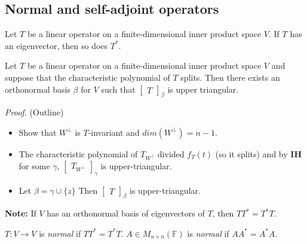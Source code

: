 \documentclass[12pt]{article}
\newenvironment{lemma}[2][Lemma]{\begin{trivlist}
\item[\hskip \labelsep {\bfseries #1}\hskip \labelsep {\bfseries #2.}]}{\end{trivlist}}
\newenvironment{theorem}[2][Theorem]{\begin{trivlist}
\item[\hskip \labelsep {\bfseries #1}\hskip \labelsep {\bfseries #2.}]}{\end{trivlist}}
\newenvironment{definition}[2][Definition]{\begin{trivlist}
\item[\hskip \labelsep {\bfseries #1}\hskip \labelsep {\bfseries #2}]}{\end{trivlist}}
\begin{document}
\subsection{Normal and self-adjoint operators}

\begin{lemma}{15}
Let $T$ be a linear operator on a finite-dimensional inner product space $V$. If $T$ has an eigenvector, then so does $T^*$.
\end{lemma}

\begin{theorem}{6.14 (Schur)}
Let $T$ be a linear operator on a finite-dimensional inner product space $V$ and suppose that the characteristic polynomial of $T$ splits. Then there exists an orthonormal basis $\beta$ for $V$ such that $\begin{bmatrix}
T
\end{bmatrix}_\beta$ is upper triangular.
\end{theorem}

\textit{Proof.} (Outline)

\begin{itemize}
    \item Show that $W^\perp$ is $T$-invariant and $dim(W^\perp) = n - 1$.
    
    \item The characteristic polynomial of $T_{W^\perp}$ divided $f_T(t)$ (so it splits) and by \textbf{IH} for some $\gamma$, $\begin{bmatrix}
    T_{W^\perp}
    \end{bmatrix}_\gamma$ is upper-triangular.
    
    \item Let $\beta = \gamma \cup \{z\}$ Then $\begin{bmatrix}
    T
    \end{bmatrix}_\beta$ is upper-triangular.
\end{itemize}

\noindent\textbf{Note:} If $V$ has an orthonormal basis of eigenvectors of $T$, then $TT^* = T^*T$.

\begin{definition}{7}
$T : V \to V$ is \textit{normal} if $TT^* = T^*T$. $A \in M_{n \times n}(\mathbb{F})$ is \textit{normal} if $AA^* = A^*A$.
\end{definition}
\end{document}
